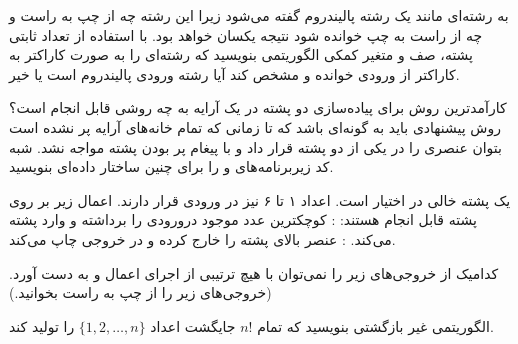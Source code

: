  به رشته‌ای مانند {} یک رشته پالیندروم گفته می‌شود زیرا این رشته چه از چپ به راست و چه از راست به چپ خوانده شود نتیجه یکسان خواهد بود. با استفاده از تعداد ثابتی پشته، صف و متغیر کمکی الگوریتمی بنویسید که رشته‌ای را به صورت کاراکتر به کاراکتر از ورودی خوانده و مشخص کند آیا رشته ورودی پالیندروم است یا خیر.

 کارآمدترین روش برای پیاده‌سازی دو پشته در یک آرایه به چه روشی قابل انجام است؟ روش پیشنهادی باید به گونه‌ای باشد که تا زمانی که تمام خانه‌های آرایه پر نشده است بتوان عنصری را در یکی از دو پشته قرار داد و با پیغام پر بودن پشته مواجه نشد. شبه کد زیربرنامه‌های {} و {} را برای چنین ساختار داده‌ای بنویسید.

 یک پشته خالی در اختیار است. اعداد ۱ تا ۶ نیز در ورودی قرار دارند. اعمال زیر بر روی پشته قابل انجام هستند:
: کوچکترین عدد موجود درورودی را برداشته و وارد پشته می‌کند.
: عنصر بالای پشته را خارج کرده و در خروجی چاپ می‌کند.

کدامیک از خروجی‌های زیر را نمی‌توان با هیچ ترتیبی از اجرای اعمال {} و {} به دست آورد. (خروجی‌های زیر را از چپ به راست بخوانید.)

 الگوریتمی غیر بازگشتی بنویسید که تمام {$n!$} جایگشت‌ اعداد {$\lbrace 1,2,\ldots ,n\rbrace$} را تولید کند.